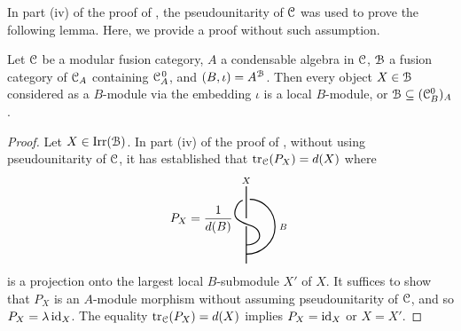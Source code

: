 \documentclass{amsart}
\begin{document}
 In part (iv) of the proof of \cite[Theorem II]{DNRX2025}, the pseudounitarity of ${\EuScript{C}}$ was used to prove the following lemma. Here, we provide a proof without such assumption.
 \begin{lem} \label{l:3.4}
 Let ${\EuScript{C}}$ be a modular fusion category, $A$ a condensable algebra in ${\EuScript{C}}$, ${\EuScript{B}}$ a fusion category of ${{\EuScript{C}}_A}$ containing ${{\EuScript{C}}_A^{\hspace{1pt}0}}$, and $(B, \iota)=A^{\EuScript{B}}$. Then every object $X \in {\EuScript{B}}$ considered as a $B$-module via the embedding $\iota$ is a local $B$-module, or ${\EuScript{B}} \subseteq ({{\EuScript{C}}_B^0})_A$. 
 \end{lem}
 \begin{proof} Let $X \in \operatorname{Irr}({\EuScript{B}})$. In part (iv) of the proof of \cite[Theorem II]{DNRX2025}, without using pseudounitarity of ${\EuScript{C}}$, it has established that $\operatorname{tr}_{\EuScript{C}}(P_{X}) = d(X)$ where 
 \begin{equation}
P_{X} = \frac{1}{d(B)}\begin{tikzpicture}[scale=1,
  x=0.2cm, y=0.2cm,
  thick,
  baseline={([yshift=-\the\fontdimen22\textfont2]diagram midpoint)}
]
  \coordinate[overlay] (diagram midpoint) at (0,5.375);
  \draw (0,10) -- (0,5.45);
  \draw (0,4.30) -- (0,-1);

  \draw
    (-0.500,8.020)
    .. controls (-1.167,7.920) and (-1.872,6.520) .. (-1.550,5.700)

    .. controls (-1.228,4.880) and (0.123,4.639) .. (0.900,4.300)

    .. controls (1.677,3.961) and (1.882,3.525) .. (1.900,2.950)

    .. controls (1.918,2.75) and (1.750,1.660) .. (0.000,1.660);

  \draw
    (0.50,8.15)
    .. controls (2.50,8.15) and (4.10,6.40) .. (4.10,4.245)
    .. controls (4.10,2.09) and (2.20,0.34) .. (0.00,0.34);

  \node[anchor=south, inner sep=2pt] at (0,10) {$\scriptstyle X$};
  \node[anchor=west, inner sep=3pt] at (4.10,4.245) {$\scriptstyle B$};
\end{tikzpicture}
 \end{equation}
 is a projection onto the largest local $B$-submodule  $X'$ of $X$. It suffices to show that $P_X$ is an $A$-module morphism without assuming pseudounitarity of ${\EuScript{C}}$, and so $P_X = \lambda \operatorname{id}_X$. The equality $\operatorname{tr}_{\EuScript{C}}(P_{X}) = d(X)$ implies $P_X = \operatorname{id}_X$ or $X = X'$. 


\end{proof}
\end{document}

